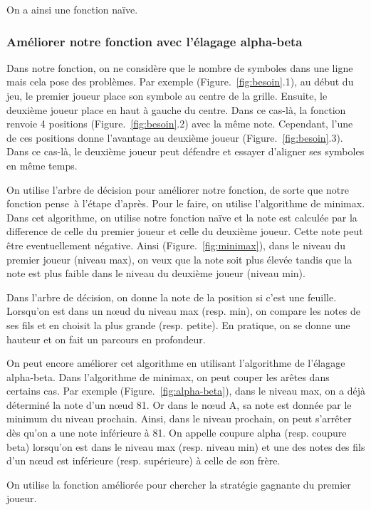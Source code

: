 \documentclass{beamer}
\begin{document}
On a ainsi une fonction naïve.

\subsubsection{Améliorer notre fonction avec l'élagage alpha-beta}
Dans notre fonction, on ne considère que le nombre de symboles dans une ligne mais cela pose des problèmes. Par exemple (\mbox{Figure. \ref{fig:besoin}.1}), au début du jeu, le premier joueur place son symbole au centre de la grille. Ensuite, le deuxième joueur place en haut à gauche du centre. Dans ce cas-là, la fonction renvoie 4 positions (\mbox{Figure. \ref{fig:besoin}.2}) avec la même note. Cependant, l'une de ces positions donne l'avantage au deuxième joueur (\mbox{Figure. \ref{fig:besoin}.3}). Dans ce cas-là, le deuxième joueur peut défendre et essayer d'aligner ses symboles en même temps. 
\par
On utilise l'arbre de décision pour améliorer notre fonction, de sorte que notre fonction \og pense\fg \ à l'étape d'après. Pour le faire, on utilise l'algorithme de minimax. Dans cet algorithme, on utilise notre fonction naïve et la note est calculée par la difference de celle du premier joueur et celle du deuxième joueur. Cette note peut être eventuellement négative. Ainsi (\mbox{Figure. \ref{fig:minimax}}), dans le niveau du premier joueur (niveau max), on veux que la note soit plus élevée tandis que la note est plus faible dans le niveau du deuxième joueur (niveau min).

Dans l'arbre de décision, on donne la note de la position si c'est une feuille. Lorsqu'on est dans un nœud du niveau max (resp. min), on compare les notes de ses fils et en choisit la plus grande (resp. petite). En pratique, on se donne une hauteur et on fait un parcours en profondeur.\par
On peut encore améliorer cet algorithme en utilisant l'algorithme de l'élagage alpha-beta. Dans l'algorithme de minimax, on peut couper les arêtes dans certains cas. Par exemple (\mbox{Figure. \ref{fig:alpha-beta}}), dans le niveau max, on a déjà déterminé la note d'un nœud 81. Or dans le nœud A, sa note est donnée par le minimum du niveau prochain. Ainsi, dans le niveau prochain, on peut s'arrêter dès qu'on a une note inférieure à 81. On appelle coupure alpha (resp. coupure beta) lorsqu'on est dans le niveau max (resp. niveau min) et une des notes des fils d'un nœud est inférieure (resp. supérieure) à celle de son frère.\par
On utilise la fonction améliorée pour chercher la stratégie gagnante du premier joueur.
\end{document}
